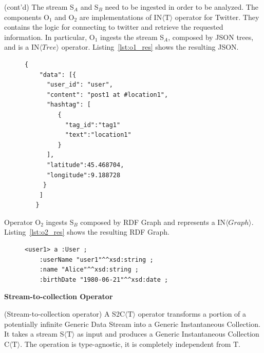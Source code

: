 \begin{Example}
(cont'd) The stream S$_A$ and S$_B$ need to be ingested in order to be analyzed.
The components O$_1$ and O$_2$ are implementations of IN$\langle\mathrm{T}\rangle$ operator for Twitter. They contains the logic for connecting to twitter and retrieve the requested information.
In particular, O$_1$ ingests the stream S$_A$, composed by JSON trees, and  is a IN$\langle Tree \rangle$ operator.
Listing~\ref{lst:o1_res} shows the resulting JSON.

\begin{figure}[ht]
\begin{minipage}{0.95\linewidth}
\begin{lstlisting}[caption={Example of the data resulting by the ingestion operation performed by O$_1$.},label=lst:o1_res,style=JSON]
  {
    "data": [{
      "user_id": "user",
      "content": "post1 at #location1",
      "hashtag": [
         { 
           "tag_id":"tag1"
           "text":"location1"
         }
      ],
      "latitude":45.468704,
      "longitude":9.188728
     }
    ]
   }
\end{lstlisting}
\end{minipage}
\end{figure}

Operator O$_2$ ingests S$_B$ composed by RDF Graph and represents a IN$\langle Graph \rangle$. 
Listing~\ref{lst:o2_res} shows the resulting RDF Graph.

\begin{figure}[ht]
\begin{minipage}{0.95\linewidth}
\begin{lstlisting}[caption={Example of the data resulting by the ingestion operation performed by O$_2$.},label=lst:o2_res,style=N3]
<user1> a :User ;
    :userName "user1"^^xsd:string ;
    :name "Alice"^^xsd:string ;
    :birthDate "1980-06-21"^^xsd:date ;
\end{lstlisting}
\end{minipage}
\end{figure}

\end{Example}

\medskip
\noindent
\textbf{Stream-to-collection Operator}
\medskip

\begin{Definition}
(Stream-to-collection operator) A S2C$\langle\mathrm{T}\rangle$ operator transforms a portion of a potentially infinite Generic Data Stream into a Generic Instantaneous Collection. 
It takes a stream S$\langle\mathrm{T}\rangle$ as input and produces a Generic Instantaneous Collection C$\langle\mathrm{T}\rangle$. The operation is type-agnostic, it is completely independent from $\mathrm{T}$.
\end{Definition}

